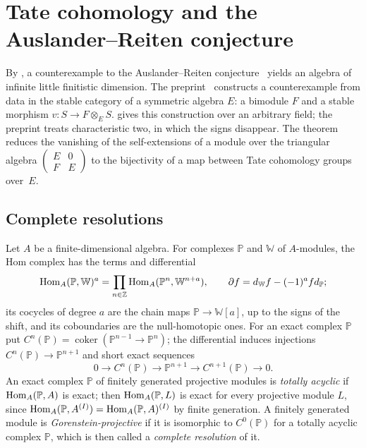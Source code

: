 \section{Tate cohomology and the Auslander--Reiten conjecture}
\label{sec:conversion}

By , a counterexample to the Auslander--Reiten
conjecture~\cite{AR75a} yields an algebra of infinite little finitistic
dimension. The preprint~\cite{OAI26ar} constructs a counterexample from data in
the stable
category of a symmetric algebra $E$: a bimodule $F$ and a stable morphism
${v\colon S\to F\otimes_ES}$.  gives this construction over
an arbitrary field; the preprint treats characteristic two, in which the signs
disappear. The theorem reduces the vanishing of the self-extensions of a module
over the triangular
algebra $\left(\begin{smallmatrix}E&0\\F&E\end{smallmatrix}\right)$ to the
bijectivity of a map between Tate cohomology groups over~$E$.

\subsection{Complete resolutions}
\label{subsec:complete-resolutions}

Let $A$ be a finite-dimensional algebra. For complexes $\mathbb{P}$ and
$\mathbb{W}$ of $A$-modules, the Hom complex has the terms and differential
\[
  \Hom[A]{\mathbb{P}}{\mathbb{W}}^a=\prod_{n\in\ZZ}\Hom[A]{\mathbb{P}^n}
  {\mathbb{W}^{n+a}},\qquad\partial f=d_{\mathbb{W}}f-(-1)^afd_{\mathbb{P}};
\]
its cocycles of degree $a$ are the chain maps ${\mathbb{P}\to\mathbb{W}[a]}$,
up to the signs of the shift, and its coboundaries are the null-homotopic ones.
For an exact complex $\mathbb{P}$ put
${C^n(\mathbb{P})=\operatorname{coker}(\mathbb{P}^{n-1}\to\mathbb{P}^n)}$; the
differential induces injections ${C^n(\mathbb{P})\to\mathbb{P}^{n+1}}$ and short
exact sequences
\begin{equation}
  \label{eq:cokernel-sequences}
  0\longrightarrow C^n(\mathbb{P})\longrightarrow\mathbb{P}^{n+1}
  \longrightarrow C^{n+1}(\mathbb{P})\longrightarrow0.
\end{equation}
An exact complex $\mathbb{P}$ of finitely generated projective modules is
\emph{totally acyclic} if $\Hom[A]{\mathbb{P}}{A}$ is exact; then
$\Hom[A]{\mathbb{P}}{L}$ is exact for every projective module $L$, since
${\Hom[A]{\mathbb{P}}{A^{(I)}}=\Hom[A]{\mathbb{P}}{A}^{(I)}}$ by finite
generation. A finitely generated module is \emph{Gorenstein-projective} if it
is isomorphic to $C^0(\mathbb{P})$ for a totally acyclic complex $\mathbb{P}$,
which is then called a \emph{complete resolution} of it.

